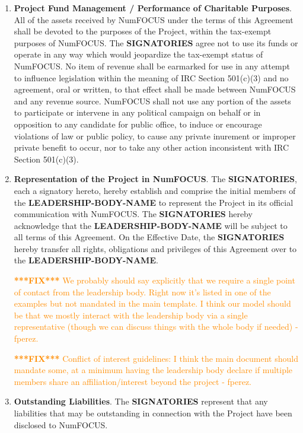 \documentclass[letterpaper,12pt]{article}
\newcommand{\fix}[1]{
  \textcolor{darkorange} { \textbf{***FIX***} #1 } }
\newcommand{\signatories}{\textbf{SIGNATORIES}}
\newcommand{\leadershipbody}{\textbf{LEADERSHIP-BODY-NAME}}
\begin{document}
\begin{enumerate}[label=\arabic*.,ref=\S~\arabic*]
\item \textbf{Project Fund Management / Performance of Charitable
  Purposes}. \label{CharitablePurpose} All of the assets received by NumFOCUS
  under the terms of this Agreement shall be devoted to the purposes of the
  Project, within the tax-exempt purposes of NumFOCUS. The \signatories{} agree
  not to use its funds or operate in any way which would jeopardize the
  tax-exempt status of NumFOCUS. No item of revenue shall be earmarked for use
  in any attempt to influence legislation within the meaning of IRC Section
  501(c)(3) and no agreement, oral or written, to that effect shall be made
  between NumFOCUS and any revenue source. NumFOCUS shall not use any portion
  of the assets to participate or intervene in any political campaign on behalf
  or in opposition to any candidate for public office, to induce or encourage
  violations of law or public policy, to cause any private inurement or
  improper private benefit to occur, nor to take any other action inconsistent
  with IRC Section 501(c)(3).

\item \textbf{Representation of the Project in
  NumFOCUS}. \label{Representation}The \signatories{}, each a signatory hereto,
  hereby establish and comprise the initial members of the \leadershipbody{} to
  represent the Project in its official communication with NumFOCUS.  The
  \signatories{} hereby acknowledge that the \leadershipbody{} will be subject
  to all terms of this Agreement.  On the Effective Date, the \signatories{}
  hereby transfer all rights, obligations and privileges of this Agreement over
  to the \leadershipbody{}.

\fix{We probably should say explicitly that we require a single point of
  contact from the leadership body. Right now it's listed in one of the
  examples but not mandated in the main template. I think our model should be
  that we mostly interact with the leadership body via a single representative
  (though we can discuss things with the whole body if needed) - fperez.}

\fix{Conflict of interest guidelines: I think the main document should mandate
  some, at a minimum having the leadership body declare if multiple members
  share an affiliation/interest beyond the project - fperez.}



\item \textbf{Outstanding Liabilities}. The \signatories{} represent that any
  liabilities that may be outstanding in connection with the Project have been
  disclosed to NumFOCUS.


\end{enumerate}
\end{document}
